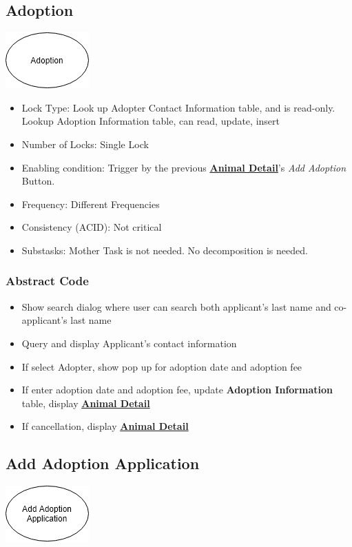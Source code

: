 \documentclass[a4paper]{article}
\begin{document}
\hypertarget{adoption}{\subsection{Adoption}}
\includegraphics[scale = 0.6]{adoption.png}

\begin{itemize}
	\item Lock Type: Look up Adopter Contact Information table, and is read-only. Lookup Adoption Information  table, can read, update, insert
	\item Number of Locks: Single Lock
	\item Enabling condition: Trigger by the previous \underline{\textbf{Animal Detail}}'s \textit{Add Adoption} Button.
	\item Frequency: Different Frequencies
	\item Consistency (ACID): Not critical
	\item Substasks: Mother Task is not needed. No decomposition is needed.
\end{itemize}

\subsubsection*{Abstract Code}

\begin{itemize}
	\item Show search dialog where user can search both applicant's last name and co-applicant's last name
	\item Query and display Applicant's contact information
	\item If select Adopter, show pop up for adoption date and adoption fee
	\item If enter adoption date and adoption fee, update \textbf{Adoption Information}  table, display  \underline{\textbf{Animal Detail}}
	\item If cancellation, display  \underline{\textbf{Animal Detail}}
\end{itemize}


\hypertarget{add_adoption_app}{\subsection{Add Adoption Application}}
\includegraphics[scale = 0.6]{add_adoption_app.png}
\end{document}

